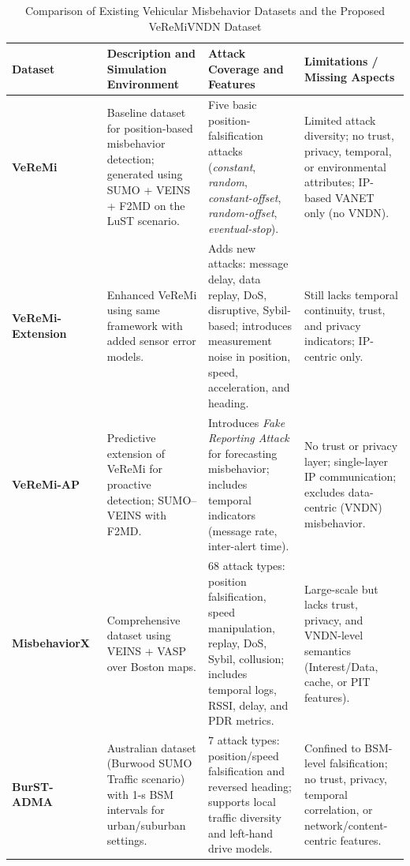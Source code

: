 \documentclass[journal,comsoc]{IEEEtran}
\begin{document}
    

\begin{table}[!t]
\centering
\caption{Comparison of Existing Vehicular Misbehavior Datasets and the Proposed VeReMiVNDN Dataset}
\label{tab:dataset_comparison}
\begin{tabular}{|p{2.2cm}|p{4.3cm}|p{5.2cm}|p{4.3cm}|}
\hline
\textbf{Dataset} & \textbf{Description and Simulation Environment} & \textbf{Attack Coverage and Features} & \textbf{Limitations / Missing Aspects} \\ \hline

\textbf{VeReMi}~\cite{Kamel2020} &
Baseline dataset for position-based misbehavior detection; generated using SUMO + VEINS + F2MD on the LuST scenario. &
Five basic position-falsification attacks (\textit{constant}, \textit{random}, \textit{constant-offset}, \textit{random-offset}, \textit{eventual-stop}). &
Limited attack diversity; no trust, privacy, temporal, or environmental attributes; IP-based VANET only (no VNDN). \\ \hline

\textbf{VeReMi-Extension}~\cite{Kamel2021} &
Enhanced VeReMi using same framework with added sensor error models. &
Adds new attacks: message delay, data replay, DoS, disruptive, Sybil-based; introduces measurement noise in position, speed, acceleration, and heading. &
Still lacks temporal continuity, trust, and privacy indicators; IP-centric only. \\ \hline

\textbf{VeReMi-AP}~\cite{Kamel2023} &
Predictive extension of VeReMi for proactive detection; SUMO–VEINS with F2MD. &
Introduces \textit{Fake Reporting Attack} for forecasting misbehavior; includes temporal indicators (message rate, inter-alert time). &
No trust or privacy layer; single-layer IP communication; excludes data-centric (VNDN) misbehavior. \\ \hline

\textbf{MisbehaviorX}~\cite{MisbehaviorX2023} &
Comprehensive dataset using VEINS + VASP over Boston maps. &
68 attack types: position falsification, speed manipulation, replay, DoS, Sybil, collusion; includes temporal logs, RSSI, delay, and PDR metrics. &
Large-scale but lacks trust, privacy, and VNDN-level semantics (Interest/Data, cache, or PIT features). \\ \hline

\textbf{BurST-ADMA}~\cite{Amanullah2022} &
Australian dataset (Burwood SUMO Traffic scenario) with 1-s BSM intervals for urban/suburban settings. &
7 attack types: position/speed falsification and reversed heading; supports local traffic diversity and left-hand drive models. &
Confined to BSM-level falsification; no trust, privacy, temporal correlation, or network/content-centric features. \\ \hline


\end{tabular}
\end{table}
\end{document}
